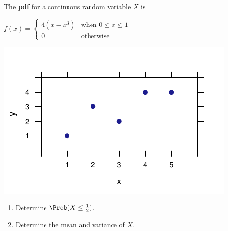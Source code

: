 \documentclass[twoside]{book}\usepackage[]{graphicx}\usepackage[]{xcolor}
\makeatletter
\def\maxwidth{ %
  \ifdim\Gin@nat@width>\linewidth
    \linewidth
  \else
    \Gin@nat@width
  \fi
}
\newenvironment{knitrout}{}{} %
\makeatother
\begin{document}
\begin{problem}
The {\bf pdf} for a continuous random variable $X$ is
\medskip

$
\displaystyle
f(x) = \begin{cases}
  4(x - x^3) & \mbox{when } 0\le x \le 1 \\
0 & \mbox{otherwise}
\end{cases}
$
\begin{knitrout}
\color{fgcolor}

{\centering \includegraphics[width=\maxwidth]{figures/fig-unnamed-chunk-160-1} 

}



\end{knitrout}

\begin{enumerate}
\item
Determine $\Prob(X \le \frac{1}{2})$.
\item
Determine the mean and variance of $X$.
\end{enumerate}
\end{problem}
\end{document}
